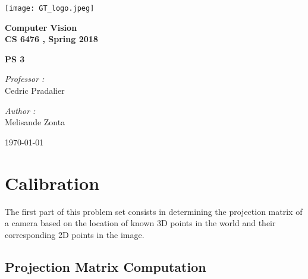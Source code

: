 \documentclass[a4paper,11pt]{article}
\begin{document}

\begin{titlepage}

\begin{center}
\texttt{[image: GT\_logo.jpeg]}
\end{center}
\hrulefill
\begin{center}\bfseries\huge
   Computer Vision \\
   CS 6476 , Spring 2018\\
   \end{center}
  \begin{center}\bfseries\large
     PS 3\\
    \hrulefill
\end{center}
\vspace*{1cm}
\begin{minipage}[t]{0.6\textwidth}
  \begin{flushleft} \large
    \emph{Professor : }\\
    Cedric Pradalier \\
  \end{flushleft}
\end{minipage}
\begin{minipage}[t]{0.3\textwidth}
  \begin{flushright} \large
    \emph{Author :} \\
    Melisande Zonta \\
  \end{flushright}
\end{minipage}
\begin{flushright}
       \today 
\end{flushright} 
\end{titlepage}

\tableofcontents
\clearpage

\section{Calibration}

The first part of this problem set consists in determining the projection matrix of a camera based on the location of known 3D points in the world and their corresponding 2D points in the image.

\subsection{Projection Matrix Computation}
\end{document}
